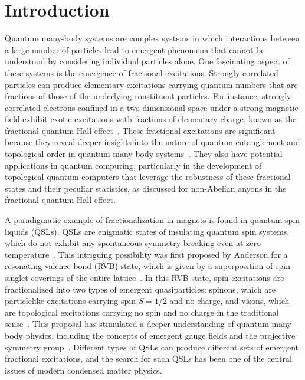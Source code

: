 \documentclass[twocolumn,superscriptaddress,showpacs, longbibliography, aps, prx]{revtex4-2}
\begin{document}
\maketitle
\section{Introduction}\label{sec:introduction}
Quantum many-body systems are complex systems in which interactions between a large number of particles lead to emergent phenomena that cannot be understood by considering individual particles alone. 
One fascinating aspect of these systems is the emergence of fractional excitations.
Strongly correlated particles can produce elementary excitations carrying quantum numbers that are fractions of those of the underlying constituent particles.  
For instance, strongly correlated electrons confined in a two-dimensional space under a strong magnetic field exhibit exotic excitations with fractions of elementary charge, known as the fractional quantum Hall effect~\cite{Laughlin1983, Wen1995}. 
These fractional excitations are significant because they reveal deeper insights into the nature of quantum entanglement and topological order in quantum many-body systems~\cite{Wen2007Book,Wen1990, KitaevP2006, LevinW2006}. 
They also have potential applications in quantum computing, particularly in the development of topological quantum computers that leverage the robustness of these fractional states and their peculiar statistics, as discussed for non-Abelian anyons in the fractional quantum Hall effect.

A paradigmatic example of fractionalization in magnets is found in quantum spin liquids (QSLs). 
QSLs are enigmatic states of insulating quantum spin systems, which do not exhibit any spontaneous symmetry breaking even at zero temperature~\cite{Anderson1973, Wen1991, Kitaev2006, Balents2010}. 
This intriguing possibility was first proposed by Anderson for a resonating valence bond (RVB) state, which is given by a superposition of spin-singlet coverings of the entire lattice~\cite{Anderson1973}.
In this RVB state, spin excitations are fractionalized into two types of emergent quasiparticles: spinons, which are particlelike excitations carrying spin $S=1/2$ and no charge, and visons, which are topological excitations carrying no spin and no charge in the traditional sense~\cite{Wen2007Book, SenthilF2000}.
This proposal has stimulated a deeper understanding of quantum many-body physics, including the concepts of emergent gauge fields and the projective symmetry group~\cite{SenthilF2000,Wen2002,Wen2003}. 
Different types of QSLs can produce different sets of emergent fractional excitations, and the search for such QSLs has been one of the central issues of modern condensed matter physics. 
\end{document}
